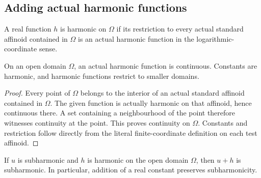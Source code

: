 \subsection{Adding actual harmonic functions}\label{subsec:fc-line-subharmonic-harmonic-addition}

\begin{definition}\label{def:fc-actual-line-harmonic-on}
\leanok
{}
A real function $h$ is harmonic on $\Omega$ if its restriction to every
actual standard affinoid contained in $\Omega$ is an actual harmonic function
in the logarithmic-coordinate sense.
\end{definition}

\begin{lemma}\label{lem:fc-line-harmonic-on-continuity}
\leanok
{}
On an open domain $\Omega$, an actual harmonic function is continuous.
Constants are harmonic, and harmonic functions restrict to smaller domains.
\end{lemma}

\begin{proof}
Every point of $\Omega$ belongs to the interior of an actual standard affinoid
contained in $\Omega$. The given function is actually harmonic on that
affinoid, hence continuous there. A set containing a neighbourhood of the
point therefore witnesses continuity at the point. This proves continuity
on $\Omega$. Constants and restriction follow directly from the literal
finite-coordinate definition on each test affinoid.
\end{proof}

\begin{lemma}\label{lem:fc-line-subharmonic-harmonic-addition}
\leanok
{}
If $u$ is subharmonic and $h$ is harmonic on the open domain $\Omega$, then
$u+h$ is subharmonic. In particular, addition of a real constant preserves
subharmonicity.
\end{lemma}

